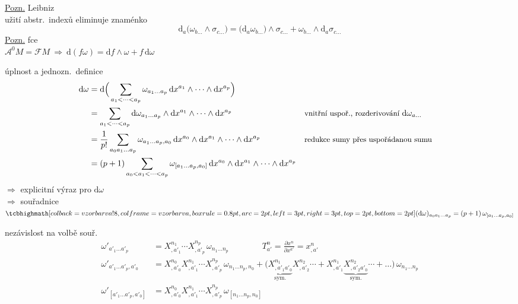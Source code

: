 \underline{Pozn.} Leibniz \\
\quad užití abstr.\ indexů eliminuje znaménko
\[
  \mathrm{d}_a\big(\omega_{b\dots}\wedge\sigma_{c\dots}\big) = \big(\mathrm{d}_a\omega_{b\dots}\big)\wedge\sigma_{c\dots} + \omega_{b\dots}\wedge\mathrm{d}_a\sigma_{c\dots}
\]
\underline{Pozn.} fce \\
\quad $\mathcal{A}^0M = \mathcal{F}M \ \Rightarrow\ \mathrm{d}(f\omega) = \mathrm{d}f\wedge\omega + f\,\mathrm{d}\omega$

úplnost a jednozn.\ definice
\begin{align*}
  \mathrm{d}\omega &= \mathrm{d}\Big(\sum_{a_1<\dots<a_p}\omega_{a_1\dots a_p}\,\mathrm{d}x^{a_1}\wedge\dots\wedge\mathrm{d}x^{a_p}\Big) \\
  &= \sum_{a_1<\dots<a_p}\mathrm{d}\omega_{a_1\dots a_p}\wedge\mathrm{d}x^{a_1}\wedge\dots\wedge\mathrm{d}x^{a_p}
     && \text{\small vnitřní uspoř., rozderivování } \mathrm{d}\omega_{a\dots} \\
  &= \frac{1}{p!}\sum_{a_0a_1\dots a_p}\omega_{a_1\dots a_p,a_0}\,\mathrm{d}x^{a_0}\wedge\mathrm{d}x^{a_1}\wedge\dots\wedge\mathrm{d}x^{a_p}
     && \text{\small redukce sumy přes uspořádanou sumu} \\
  &= (p+1)\sum_{a_0<a_1<\dots<a_p}\omega_{[a_1\dots a_p,a_0]}\,\mathrm{d}x^{a_0}\wedge\mathrm{d}x^{a_1}\wedge\dots\wedge\mathrm{d}x^{a_p}
\end{align*}
$\Rightarrow$ explicitní výraz pro $\mathrm{d}\omega$ \\
$\Rightarrow$ souřadnice \quad $\vzorec{(\mathrm{d}\omega)_{a_0a_1\dots a_p} = (p+1)\,\omega_{[a_1\dots a_p,a_0]}}$

nezávislost na volbě souř.
\begin{align*}
  \omega'_{a'_1\dots a'_p} &= X^{n_1}_{,a'_1}\cdots X^{n_p}_{,a'_p}\,\omega_{n_1\dots n_p}
    \qquad\qquad T^n_{a'} = \frac{\partial x^n}{\partial x^{a'}} = x^n_{,a'} \\
  \omega'_{a'_1\dots a'_p,a'_0} &= X^{n_0}_{,a'_0}X^{n_1}_{,a'_1}\cdots X^{n_p}_{,a'_p}\,\omega_{n_1\dots n_p,n_0}
    + \big(\underbrace{X^{n_1}_{,a'_1a'_0}}_{\text{sym.}}X^{n_2}_{,a'_2}\cdots + X^{n_1}_{,a'_1}\underbrace{X^{n_2}_{,a'_2a'_0}}_{\text{sym.}}\cdots + \dots\big)\,\omega_{n_1\dots n_p} \\
  \omega'_{[a'_1\dots a'_p,a'_0]} &= X^{n_0}_{,a'_0}X^{n_1}_{,a'_1}\cdots X^{n_p}_{,a'_p}\,\omega_{[n_1\dots n_p,n_0]}
\end{align*}

